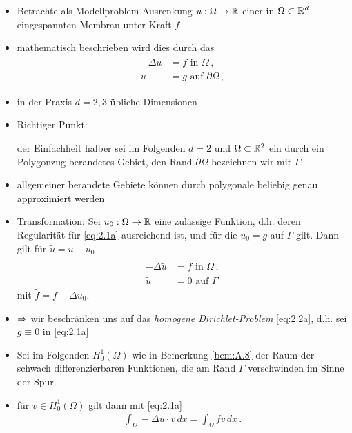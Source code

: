 \begin{itemize}
\item Betrachte als Modellproblem Ausrenkung $u: \Omega \rightarrow \mathbb{R}$ einer in $\Omega \subset \mathbb{R}^d$ eingespannten Membran unter Kraft $f$
\item mathematisch beschrieben wird dies durch das \textit{}
\begin{align}\label{eq:2.1a}
\begin{aligned}
	-\Delta u &= f \text{ in } \Omega \, ,\\
	u & = g \text{ auf } \partial \Omega \, ,
\end{aligned}
\end{align}
\item in der Praxis $d = 2,3$ übliche Dimensionen
\item Richtiger Punkt: \begin{notation} 
der Einfachheit halber sei im Folgenden $d = 2$ und $\Omega \subset \mathbb{R}^2$ ein durch ein Polygonzug berandetes Gebiet, den Rand $\partial \Omega$ bezeichnen wir mit $\Gamma$.
\end{notation}
\item allgemeiner berandete Gebiete können durch polygonale beliebig genau approximiert werden
\item Transformation: Sei $u_0: \Omega \rightarrow \mathbb{R}$ eine zulässige Funktion, d.h. deren Regularität für \eqref{eq:2.1a} ausreichend ist, und für die $u_0 = g$ auf $\Gamma$ gilt. Dann gilt für 
$\tilde u = u-u_0$
\begin{align}\label{eq:2.2a}
\begin{aligned}
	-\Delta \tilde u &= \tilde f \text{ in } \Omega \, ,\\
	\tilde u & = 0 \text{ auf } \Gamma 
\end{aligned}
\end{align}
mit $\tilde f = f-\Delta u_0$.
\item $\Rightarrow$ wir beschränken uns auf das \textit{homogene Dirichlet-Problem} \eqref{eq:2.2a}, d.h. sei $g\equiv 0$ in \eqref{eq:2.1a}
\item Sei im Folgenden $H^1_0 (\Omega)$ wie in Bemerkung \ref{bem:A.8} der Raum der schwach differenzierbaren Funktionen, die am Rand $\Gamma$ verschwinden im Sinne der Spur.
\item für $v \in H^1_0(\Omega)$ gilt dann mit \eqref{eq:2.1a}
\begin{align*}
	\int_\Omega -\Delta u \cdot v \, dx = \int_\Omega f v \, dx \, .
\end{align*}

\end{itemize}
